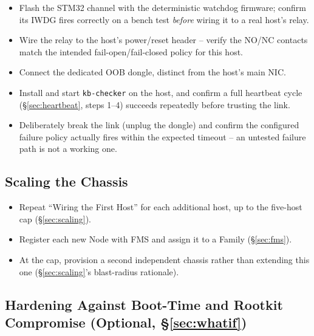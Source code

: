 \documentclass[11pt,a4paper]{article}
\begin{document}
\begin{itemize}[label=$\square$]
  \item Flash the STM32 channel with the deterministic watchdog
    firmware; confirm its IWDG fires correctly on a bench test
    \emph{before} wiring it to a real host's relay.
  \item Wire the relay to the host's power/reset header -- verify the
    NO/NC contacts match the intended fail-open/fail-closed policy for
    this host.
  \item Connect the dedicated OOB dongle, distinct from the host's main
    NIC.
  \item Install and start \texttt{kb-checker} on the host, and confirm
    a full heartbeat cycle (\S\ref{sec:heartbeat}, steps 1--4) succeeds
    repeatedly before trusting the link.
  \item Deliberately break the link (unplug the dongle) and confirm the
    configured failure policy actually fires within the expected
    timeout -- an untested failure path is not a working one.
\end{itemize}

\subsection{Scaling the Chassis}

\begin{itemize}[label=$\square$]
  \item Repeat ``Wiring the First Host'' for each additional host, up
    to the five-host cap (\S\ref{sec:scaling}).
  \item Register each new Node with FMS and assign it to a Family
    (\S\ref{sec:fms}).
  \item At the cap, provision a second independent chassis rather than
    extending this one (\S\ref{sec:scaling}'s blast-radius rationale).
\end{itemize}

\subsection{Hardening Against Boot-Time and Rootkit Compromise (Optional, \S\ref{sec:whatif})}
\end{document}
